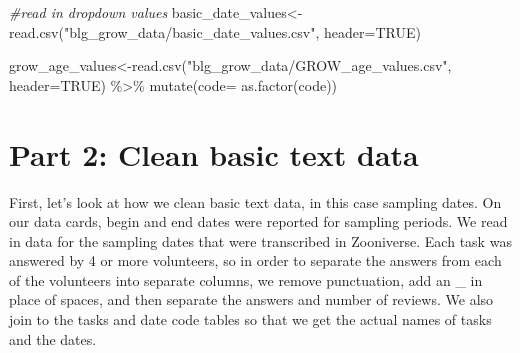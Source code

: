 \documentclass[
]{article}
\newenvironment{Shaded}{\begin{snugshade}}{\end{snugshade}}
\newcommand{\AttributeTok}[1]{\textcolor[rgb]{0.77,0.63,0.00}{#1}}
\newcommand{\CommentTok}[1]{\textcolor[rgb]{0.56,0.35,0.01}{\textit{#1}}}
\newcommand{\ConstantTok}[1]{\textcolor[rgb]{0.00,0.00,0.00}{#1}}
\newcommand{\FunctionTok}[1]{\textcolor[rgb]{0.00,0.00,0.00}{#1}}
\newcommand{\NormalTok}[1]{#1}
\newcommand{\OtherTok}[1]{\textcolor[rgb]{0.56,0.35,0.01}{#1}}
\newcommand{\SpecialCharTok}[1]{\textcolor[rgb]{0.00,0.00,0.00}{#1}}
\newcommand{\StringTok}[1]{\textcolor[rgb]{0.31,0.60,0.02}{#1}}
\begin{document}
\begin{Shaded}
\begin{Highlighting}[]
\CommentTok{\#read in dropdown values }
\NormalTok{basic\_date\_values}\OtherTok{\textless{}{-}}\FunctionTok{read.csv}\NormalTok{(}\StringTok{"blg\_grow\_data/basic\_date\_values.csv"}\NormalTok{, }\AttributeTok{header=}\ConstantTok{TRUE}\NormalTok{)}

\NormalTok{grow\_age\_values}\OtherTok{\textless{}{-}}\FunctionTok{read.csv}\NormalTok{(}\StringTok{"blg\_grow\_data/GROW\_age\_values.csv"}\NormalTok{, }\AttributeTok{header=}\ConstantTok{TRUE}\NormalTok{) }\SpecialCharTok{\%\textgreater{}\%} 
  \FunctionTok{mutate}\NormalTok{(}\AttributeTok{code=} \FunctionTok{as.factor}\NormalTok{(code))}
\end{Highlighting}
\end{Shaded}

\hypertarget{part-2-clean-basic-text-data}{%
\section{Part 2: Clean basic text
data}\label{part-2-clean-basic-text-data}}

First, let's look at how we clean basic text data, in this case sampling
dates. On our data cards, begin and end dates were reported for sampling
periods. We read in data for the sampling dates that were transcribed in
Zooniverse. Each task was answered by 4 or more volunteers, so in order
to separate the answers from each of the volunteers into separate
columns, we remove punctuation, add an \_ in place of spaces, and then
separate the answers and number of reviews. We also join to the tasks
and date code tables so that we get the actual names of tasks and the
dates.
\end{document}
